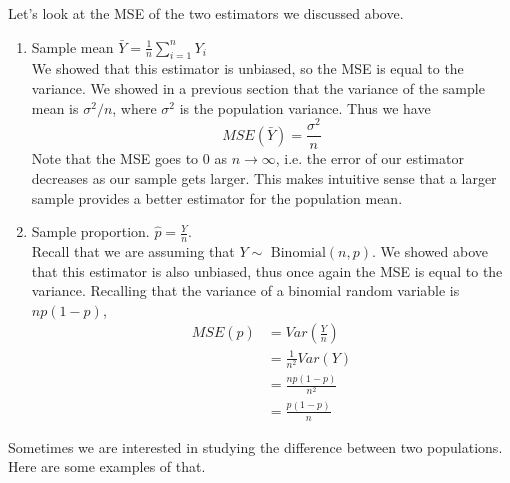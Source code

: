 \documentclass[notes.tex]{subfiles}
\begin{document}
Let's look at the MSE of the two estimators we discussed above.
\begin{enumerate}
\item Sample mean $\bar{Y} = \frac{1}{n}\sum_{i=1}^n Y_i$\\

We showed that this estimator is unbiased, so the MSE is equal to the variance. We showed in a previous section that the variance of the sample mean is $\sigma^2 / n$, where $\sigma^2$ is the population variance. Thus we have
\[
MSE(\bar{Y}) = \frac{\sigma^2}{n}
\]
Note that the MSE goes to 0 as $n \rightarrow \infty$, i.e. the error of our estimator decreases as our sample gets larger. This makes intuitive sense that a larger sample provides a better estimator for the population mean.

\item Sample proportion. $\hat{p} = \frac{Y}{n}$. \\

Recall that we are assuming that $Y \sim\text{ Binomial}(n, p)$. We showed above that this estimator is also unbiased, thus once again the MSE is equal to the variance. Recalling that the variance of a binomial random variable is $np(1-p)$,
\begin{align*}
MSE(\hat{p}) &= Var\left(\frac{Y}{n}\right) \\
&= \frac{1}{n^2} Var(Y) \\
&= \frac{np(1-p)}{n^2}\\
&= \frac{p(1-p)}{n}
\end{align*}

\end{enumerate}

Sometimes we are interested in studying the difference between two populations. Here are some examples of that.
\end{document}
